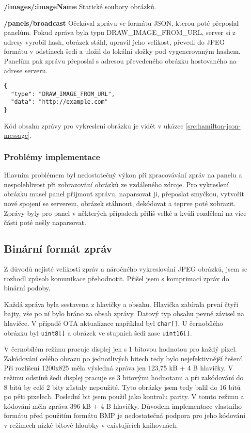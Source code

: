 \textbf{/images/:imageName} Statické soubory obrázků.

\textbf{/panels/broadcast} Očekával zprávu ve formátu JSON, kterou poté přeposlal panelům. Pokud zpráva byla typu DRAW\_IMAGE\_FROM\_URL, server si z adresy vyrobil hash, obrázek stáhl, upravil jeho velikost, převedl do JPEG formátu v odstínech šedi a uložil do lokální složky pod vygenerovaným hashem. Panelům pak zprávu přeposlal s adresou převedeného obrázku hostovaného na adrese serveru.

\vspace{1cm}

\begin{lstlisting}[label=src:hamilton-json-message,caption={Obsah zprávy DRAW\_IMAGE\_FROM\_URL ve verzi Hamilton}]
{
  "type": "DRAW_IMAGE_FROM_URL",
  "data": "http://example.com"
}
\end{lstlisting}

Kód obsahu zprávy pro vykreslení obrázku je vidět v ukázce \ref{src:hamilton-json-message}.

\subsubsection{Problémy implementace}
Hlavním problémem byl nedostatečný výkon při zpracovávání zpráv na panelu a nespolehlivost při zobrazování obrázků ze vzdáleného zdroje. Pro vykreslení obrázku musel panel přijmout zprávu, naparsovat ji, přeposlat smyčkou, vytvořit nové spojení se serverem, obrázek stáhnout, dekódovat a teprve poté zobrazit. Zprávy byly pro panel v některých případech příliš velké a kvůli rozdělení na více části poté nešly naparsovat.

\subsection{Binární formát zpráv}\label{binarni-format-navrh}
Z důvodů nejisté velikosti zpráv a náročného vykreslování JPEG obrázků, jsem se rozhodl způsob komunikace přehodnotit. Přišel jsem s komprimací zpráv do binární podoby.

Každá zpráva byla sestavena z hlavičky a obsahu. Hlavička zabírala první čtyři bajty, vše po ní bylo bráno za obsah zprávy. Datový typ obsahu pevně závisel na hlavičce. V případě OTA aktualizace například byl \lstinline|char[]|. U černobílého obrázku byl \lstinline|uint8[]| a obrázek ve stupních šedi zase \lstinline|uint16[]|.

V černobílém režimu pracuje displej jen s 1 bitovou hodnotou pro každý pixel. Zakódování celého obrazu po jednotlivých bitech tedy bylo nejefektivnější řešení. Při rozlišení 1200x825 měla výsledná zpráva jen 123,75 kB + 4 B hlavičky. V režimu odstínů šedi displej pracuje se 3 bitovými hodnotami a při zakódování do 8 bitů by celé 2 bity zůstaly nepoužité. Tyto obrázky jsem tedy balil do 16 bitů po pěti pixelech. Poslední bit jsem použil jako kontrolu parity. V tomto režimu a kódování měla zpráva 396 kB + 4 B hlavičky. Důvodem implementace vlastního formátu před použitím formátu BMP je nedostatečná podpora pro jeho kódování v režimech nízké bitové hloubky v existujících knihovnách.

